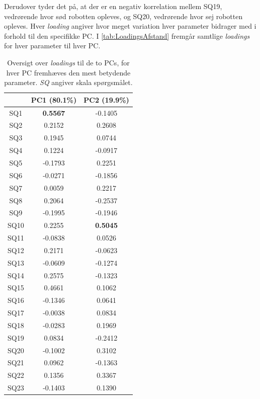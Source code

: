 Derudover tyder det på, at der er en negativ korrelation mellem SQ19, vedrørende hvor sød robotten opleves, og SQ20, vedrørende hvor sej robotten opleves.\blankline
%
Hver \textit{loading} angiver hvor meget variation hver parameter bidrager med i forhold til den specifikke PC. I \autoref{tab:LoadingsAfstand} fremgår samtlige \textit{loadings} for hver parameter til hver PC. 
%
\begin{table}[H]
\centering
\begin{tabular}{c|c|c}
    & PC1 (80.1\%)    & PC2 (19.9\%)    \\ \hline
SQ1  & \textbf{0.5567} & -0.1405         \\ \hline
SQ2  & 0.2152          & 0.2608          \\ \hline
SQ3  & 0.1945          & 0.0744          \\ \hline
SQ4  & 0.1224          & -0.0917         \\ \hline
SQ5  & -0.1793         & 0.2251          \\ \hline
SQ6  & -0.0271         & -0.1856         \\ \hline
SQ7  & 0.0059          & 0.2217          \\ \hline
SQ8  & 0.2064          & -0.2537         \\ \hline
SQ9  & -0.1995         & -0.1946         \\ \hline
SQ10 & 0.2255          & \textbf{0.5045} \\ \hline
SQ11 & -0.0838         & 0.0526          \\ \hline
SQ12 & 0.2171          & -0.0623         \\ \hline
SQ13 & -0.0609         & -0.1274         \\ \hline
SQ14 & 0.2575          & -0.1323         \\ \hline
SQ15 & 0.4661          & 0.1062          \\ \hline
SQ16 & -0.1346         & 0.0641          \\ \hline
SQ17 & -0.0038         & 0.0834          \\ \hline
SQ18 & -0.0283         & 0.1969          \\ \hline
SQ19 & 0.0834          & -0.2412         \\ \hline
SQ20 & -0.1002         & 0.3102          \\ \hline
SQ21 & 0.0962          & -0.1363         \\ \hline
SQ22 & 0.1356          & 0.3367          \\ \hline
SQ23 & -0.1403         & 0.1390         
\end{tabular}
\caption{Oversigt over \textit{loadings} til de to PCs, for hver PC fremhæves den mest betydende parameter. \textit{SQ} angiver skala spørgsmålet.}
\label{tab:LoadingsAfstand}
\end{table}
\noindent
%

